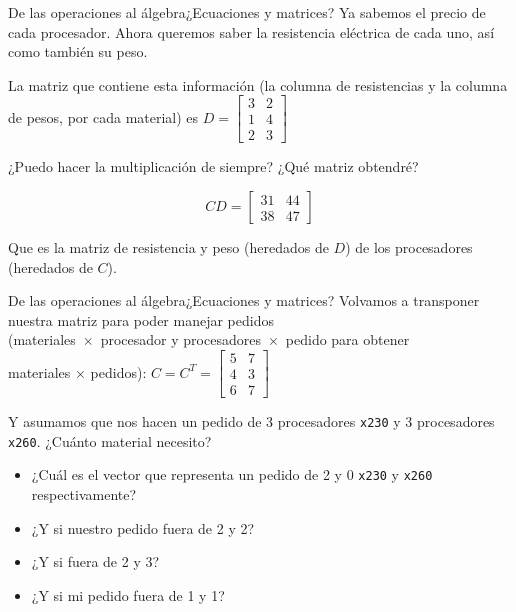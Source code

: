 \documentclass[spanish, c]{beamer}
\begin{document}
\begin{frame}{De las operaciones al álgebra}{¿Ecuaciones y matrices?}
    Ya sabemos el precio de cada procesador. Ahora queremos saber la resistencia eléctrica de cada uno, así como también su peso. \pause

    La matriz que contiene esta información (la columna de resistencias y la columna de pesos, por cada material) es
    $D = \begin{bmatrix*}
        3 & 2 \\
        1 & 4 \\
        2 & 3
    \end{bmatrix*}$

    \bigskip
    
    ¿Puedo hacer la multiplicación de siempre? ¿Qué matriz obtendré? \pause

    \[
        CD = \begin{bmatrix*}
            31 & 44 \\
            38 & 47
        \end{bmatrix*}
    \]

    Que es la matriz de resistencia y peso (heredados de $D$) de los procesadores (heredados de $C$).
\end{frame}

\begin{frame}{De las operaciones al álgebra}{¿Ecuaciones y matrices?}
    Volvamos a transponer nuestra matriz para poder manejar pedidos \\
    (materiales~$\times$~procesador y procesadores~$\times$~pedido para obtener\\
    materiales $\times$ pedidos):
    $C = C^T = 
    \begin{bmatrix}
        5 & 7 \\
        4 & 3 \\
        6 & 7
    \end{bmatrix}$
    
    \bigskip

    Y asumamos que nos hacen un pedido de 3 procesadores \texttt{x230} y 3 procesadores \texttt{x260}.
    ¿Cuánto material necesito? \pause

    \begin{itemize}[<+->]
        \item ¿Cuál es el vector que representa un pedido de 2 y 0 \texttt{x230} y \texttt{x260} respectivamente?
        \item ¿Y si nuestro pedido fuera de 2 y 2?
        \item ¿Y si fuera de 2 y 3?
        \item ¿Y si mi pedido fuera de 1 y 1?
    \end{itemize}
\end{frame}
\end{document}
